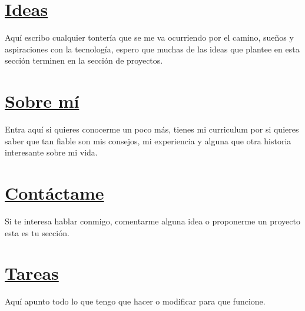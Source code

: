 \documentclass[11pt]{article}
\begin{document}
\section*{\href{ideas.html}{Ideas}}
\label{sec:org0000004}
\begin{ideas}
Aquí escribo cualquier tontería que se me va ocurriendo por el
camino, sueños y aspiraciones con la tecnología, espero que muchas
de las ideas que plantee en esta sección terminen en la sección de proyectos.
\end{ideas}
\section*{\href{aboutme.html}{Sobre mí}}
\label{sec:org0000005}
\begin{aboutme}
Entra aquí si quieres conocerme un poco más, tienes mi curriculum
por si quieres saber que tan fiable son mis consejos, mi experiencia
y alguna que otra historia interesante sobre mi vida.
\end{aboutme}
\section*{\href{contactme.html}{Contáctame}}
\label{sec:org0000006}
\begin{contactme}
Si te interesa hablar conmigo, comentarme alguna idea o proponerme
un proyecto esta es tu sección.
\end{contactme}
\section*{\href{agenda.html}{Tareas}}
\label{sec:org0000007}
\begin{tasks}
Aquí apunto todo lo que tengo que hacer o modificar para que funcione.
\end{tasks}
\end{document}
